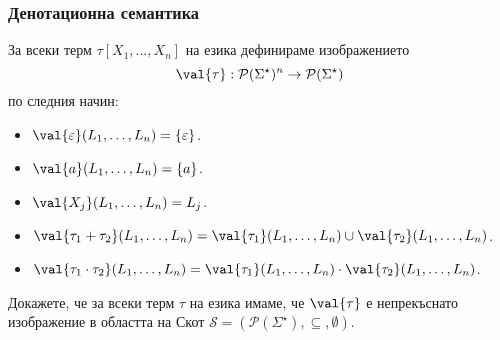 \subsubsection*{Денотационна семантика}

За всеки терм $\tau[X_1,\dots,X_n]$ на езика \CFG дефинираме изображението
\[\val{\tau}: \mathcal{P}(\Sigma^\star)^n \to \mathcal{P}(\Sigma^\star)\]
 по следния начин:
\begin{itemize}
\item 
  $\val{\varepsilon}(L_1,\dots,L_n) = \{\varepsilon\}$.
\item 
  $\val{a}(L_1,\dots,L_n) = \{a\}$.
\item 
  $\val{X_j}(L_1,\dots,L_n) = L_j$.
\item
  $\val{\tau_1 + \tau_2}(L_1,\dots,L_n) = \val{\tau_1}(L_1,\dots,L_n) \cup \val{\tau_2}(L_1,\dots,L_n)$.
\item
  $\val{\tau_1 \cdot \tau_2}(L_1,\dots,L_n) = \val{\tau_1}(L_1,\dots,L_n) \cdot \val{\tau_2}(L_1,\dots,L_n)$.
\end{itemize}

\begin{problem}
  Докажете, че за всеки терм $\tau$ на езика \REG имаме, че $\val{\tau}$ е непрекъснато изображение в областта на Скот
  $\mathcal{S} = ( \mathcal{P}(\Sigma^\star),\subseteq, \emptyset)$.
\end{problem}


